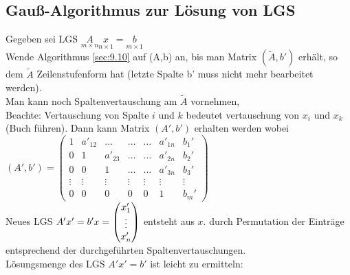 \subsection{Gau\ss-Algorithmus zur Lösung von LGS}\label{sec:9.12}
Gegeben sei LGS $\underset{m\times n}{A}\underset{n\times 1}{x} = \underset{m\times1}{b}$\\
Wende Algorithmus \ref{sec:9.10} auf (A,b) an, bis man Matrix $(\tilde{A},b')$ erhält, so dem $\tilde{A}$ Zeilenstufenform hat (letzte Spalte b' muss nicht mehr bearbeitet werden).\\
Man kann noch Spaltenvertauschung am $\tilde{A}$ vornehmen,\\ Beachte: Vertauschung von Spalte $i$ und $k$ bedeutet vertauschung von $x_i$ und $x_k$ (Buch führen).
Dann kann Matrix $(A',b')$ erhalten werden wobei\\ $(A',b') = 
\begin{pmatrix}
1 & a'_{12}&\ldots&\ldots&\ldots& a'_{1n}& b_1'\\
0 & 1 & a'_{23}&\ldots&\ldots& a'_{2n}& b_2'\\
0 & 0 & 1 & \ldots & \ldots & a'_{3n} & b_3'\\
\vdots & \vdots & \vdots & \vdots & \vdots & \vdots & \vdots\\
0 & 0 & 0 & 0 & 0 & 1 & b_m'
\end{pmatrix}$\\
Neues LGS $A'x'=b'\\
x = \begin{pmatrix}
x_1'\\
\vdots\\
x_n'
\end{pmatrix}$ entsteht aus $x$. durch Permutation der Einträge entsprechend der durchgeführten Spaltenvertauschungen.\\
Lösungsmenge des LGS $A'x'=b'$ ist leicht zu ermitteln:

